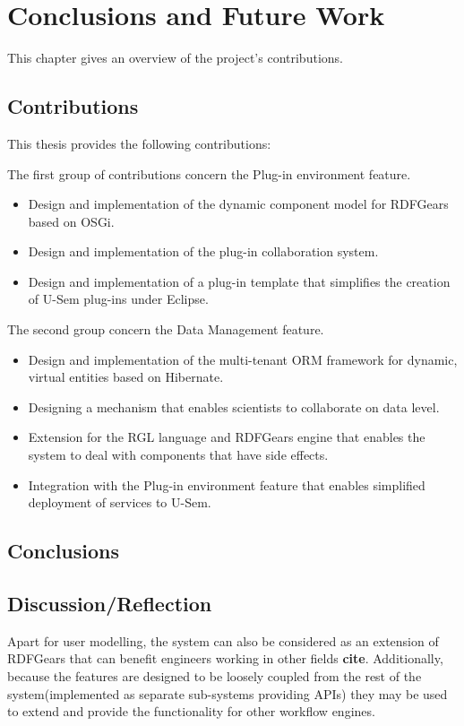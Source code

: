 
\chapter{\label{cha:conclusions}Conclusions and Future Work}

This chapter gives an overview of the project's contributions.


\section{Contributions}
This thesis provides the following contributions:

The first group of contributions concern the Plug-in environment feature.
\begin{itemize}
	\item Design and implementation of the dynamic component model for RDFGears based on OSGi.
	\item Design and implementation of the plug-in collaboration system.
	\item Design and implementation of a plug-in template that simplifies the creation of U-Sem plug-ins under Eclipse.
\end{itemize}

The second group concern the Data Management feature.
\begin{itemize}
	\item Design and implementation of the multi-tenant ORM framework for dynamic, virtual entities based on Hibernate.
	\item Designing a mechanism that enables scientists to collaborate on data level.
	\item Extension for the RGL language and RDFGears engine that enables the system to deal with components that have side effects.
	\item Integration with the Plug-in environment feature that enables simplified deployment of services to U-Sem.
\end{itemize}


\section{Conclusions}


\section{Discussion/Reflection}
Apart for user modelling, the system can also be considered as an extension of RDFGears that can benefit engineers working in other fields \textbf{cite}. Additionally, because the features are designed to be loosely coupled from the rest of the system(implemented as separate sub-systems providing APIs) they may be used to extend and provide the functionality for other workflow engines.

